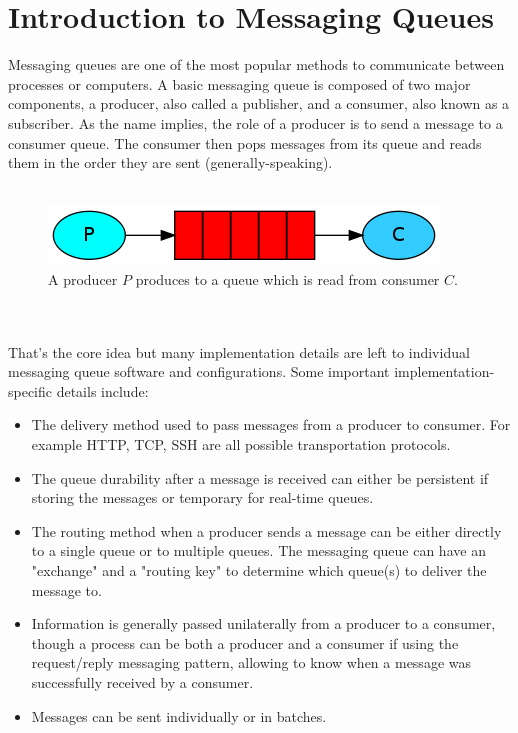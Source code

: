 \documentclass[12pt]{report}
\begin{document}
\section*{Introduction to Messaging Queues}
\par\indent
Messaging queues are one of the most popular methods to communicate between processes or computers. A basic messaging queue is composed of two major components, a producer, also called a publisher, and a consumer, also known as a subscriber. As the name implies, the role of a producer is to send a message to a consumer queue. The consumer then pops messages from its queue and reads them in the order they are sent (generally-speaking).
\\ \\
\begin{figure}[h]
\centering
\includegraphics{simple_queue}
\caption{A producer $P$ produces to a queue which is read from consumer $C$.}
\end{figure}
\\ \\
That's the core idea but many implementation details are left to individual messaging queue software and configurations. Some important implementation-specific details include:
\begin{itemize}
  \item The delivery method used to pass messages from a producer to consumer. For example HTTP, TCP, SSH are all possible transportation protocols.
  \item The queue durability after a message is received can either be persistent if storing the messages or temporary for real-time queues.
  \item The routing method when a producer sends a message can be either directly to a single queue or to multiple queues. The messaging queue can have an "exchange" and a "routing key" to determine which queue(s) to deliver the message to. 
  \item Information is generally passed unilaterally from a producer to a consumer, though a process can be both a producer and a consumer if using the request/reply messaging pattern, allowing to know when a message was successfully received by a consumer.
  \item Messages can be sent individually or in batches.
\end{itemize}
 
\end{document}
